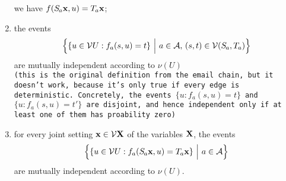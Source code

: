 \documentclass{article}
\begin{document}
\begin{defn}
\begin{enumerate}[label=(\alph*)]
        we have $f(\Src a \mat x, u) = \Tgt a \mat x$;
        \item[\color{red}(d0)]
        {\color{red}
        the events 
        \[ 
            \Big\{ 
                 \{ u \in \V U : f_a(s,u) = t \}
                ~\Big|~a \in \Ar,\, (s,t) \in \V(\Src a, \Tgt a) \Big\}
        \]
        are mutually independent according to $\nu(U)$\\[1ex]
        \texttt{(this is the original definition from the email chain, but it doesn't work, because it's only true if every edge is deterministic. 
        Concretely, the events 
            $\{u : f_a(s,u) = t\}$ and $\{u : f_a(s,u) = t'\}$ are disjoint, 
          and hence independent only if at least one of them has proability zero)}
        }
        \item
        for every joint setting $\mathbf{x} \in \mathcal V\mathbf{X}$ of the variables $\mathbf{X}$, 
        the events
        \[ 
            \Big\{ 
                \{ u \in \V U : f_a(\Src a \mat x, u) = \Tgt a \mat x \} 
                ~\Big|~a \in \Ar \Big\}
        \]
        are mutually independent according to $\nu(U)$.
    \end{enumerate}
\end{defn}



\end{document}
